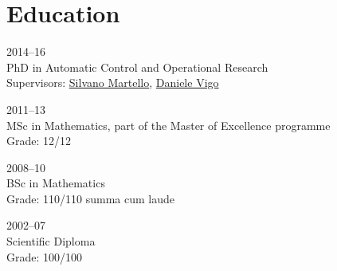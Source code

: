 \section*{Education}

\begin{paracol}{2}
  \textsc{2014--16}
\switchcolumn
  \\
  PhD in Automatic Control and Operational Research\\
  Supervisors: \href{https://scholar.google.com/citations?user=o4a20zsAAAAJ}{Silvano Martello}, \href{https://scholar.google.com/citations?user=2kk8d_AAAAAJ}{Daniele Vigo}
\end{paracol}

\begin{paracol}{2}
  \textsc{2011--13}
\switchcolumn
  \\
  MSc in Mathematics, part of the Master of Excellence programme\\
  Grade: 12/12
\end{paracol}

\begin{paracol}{2}
  \textsc{2008--10}
\switchcolumn
  \\
  BSc in Mathematics\\
  Grade: 110/110 summa cum laude
\end{paracol}

\begin{paracol}{2}
  \textsc{2002--07}
\switchcolumn
  \\
  Scientific Diploma\\
  Grade: 100/100
\end{paracol}
